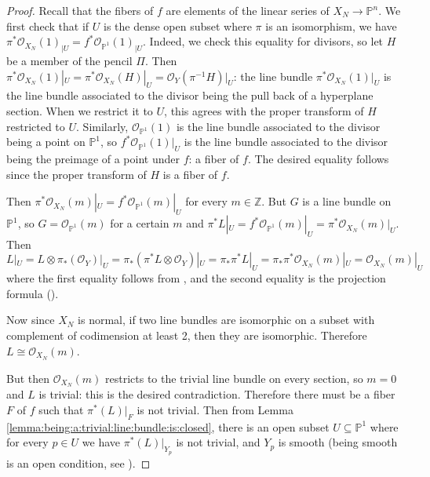 \documentclass[11pt]{article} %
\theoremstyle{definition}
\renewcommand{\P}{{\mathbb P}}
\newcommand{\green}[1]{{\color{calpolypomonagreen} #1}}
\newcommand{\ra}{\rightarrow}
\begin{document}
\begin{proof}
Recall that the fibers of $f$ are elements of the linear series of $X_{N}\to \mathbb{P}^n$. We first check that if $U$ is the dense open subset where $\pi$ is an isomorphism, we have $\pi^*\mathcal{O}_{X_N}(1)_{|U} = f^*\mathcal{O}_{\mathbb{P}^1}(1)_{|U}$. Indeed, we check this equality for divisors, so let $H$ be a member of the pencil $\Pi$.
Then $\pi^*\mathcal{O}_{X_N}(1)|_U = \pi^*\mathcal{O}_{X_N}(H)|_U = \mathcal{O}_Y(\pi^{-1}H)|_U $: the line bundle $\pi^*\mathcal{O}_{X_N}(1)|_U$ is the line bundle associated to the divisor being the pull back of a  hyperplane section. When we restrict it to $U$, this agrees with the proper transform of $H$ restricted to $U$. Similarly, $\mathcal{O}_{\mathbb{P}^1}(1)$ is the line bundle associated to the divisor being a point on $\P^1$, so $f^*\mathcal{O}_{\mathbb{P}^1}(1)|_U$ is the line bundle associated to the divisor being the preimage of a point under $f$: a fiber of $f$. The desired equality follows since the proper transform of $H$ is a fiber of $f$.


Then $\pi^*\mathcal{O}_{X_N}(m)|_U = f^*\mathcal{O}_{\mathbb{P}^1}(m)|_U$ for every $m\in \mathbb{Z}$. But $G$ is a line bundle on $\mathbb{P}^1$, so $G = \mathcal{O}_{\mathbb{P}^1}(m)$ for a certain $m$ and $\pi^*L|_U = f^*\mathcal{O}_{\mathbb{P}^1}(m)|_U = \pi^*\mathcal{O}_{X_N}(m)|_U$. Then $$L|_U = L\otimes \pi_*(\mathcal{O}_Y)|_U = \pi_*(\pi^* L \otimes \mathcal{O}_Y)|_U  =  \pi_*\pi^* L|_U = \pi_*\pi^*\mathcal{O}_{X_N}(m)|_U=\mathcal{O}_{X_N}(m)|_U$$
where the first equality follows from \cite[Proposition V.3.4]{Hart}, and the second equality is the projection formula (\cite[Exercise II.5.1]{Hart}).

Now since $X_N$ is normal, if two line bundles are isomorphic on a subset with complement of codimension at least 2, then they are isomorphic. Therefore $L \cong \mathcal{O}_{X_N}(m)$.

But then $\mathcal{O}_{X_{N}}(m)$ restricts to the trivial line bundle on every section, so $m = 0$ and $L$ is trivial: this is the desired contradiction.
Therefore there must be a fiber $F$ of $f$ such that $\pi^*(L)|_F$ is not trivial. Then from Lemma \ref{lemma:being:a:trivial:line:bundle:is:closed}, there is an open subset $U\subseteq \mathbb{P}^1$ where for every $p\in U$ we have $\pi^*(L)|_{Y_p}$ is not trivial, and $Y_p$ is smooth (being smooth is an open condition, see \cite[Theorem 12.2.4]{EGAIV}).
\end{proof}
\end{document}
